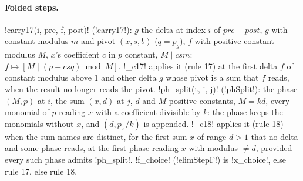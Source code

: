 {{{\paragraph{Folded steps.} \lexpy!carry17(i, pre, f, post)! (\lexlean!carry17!): $g$ the delta at index
$i$ of $pre + post$, $g$ with constant modulus $m$ and pivot $(x, s, b)$ ($q = p_g$), $f$ with
positive constant modulus $M$, $x$'s coefficient $c$ in $p$ constant, $M \mid csm$:
$f \mapsto [M \mid (p - c s q) \bmod M]$. \lexpy!_c17! applies it (rule 17) at the first delta $f$
of constant modulus above 1 and other delta $g$ whose pivot is a sum that $f$ reads, when the
result no longer reads the pivot. \lexpy!ph_split(t, i, j)! (\lexlean!phSplit!): the phase $(M, p)$ at
$i$, the sum $(x, d)$ at $j$, $d$ and $M$ positive constants, $M = kd$, every monomial of $p$
reading $x$ with a coefficient divisible by $k$: the phase keeps the monomials without $x$, and
$(d, p_x/k)$ is appended. \lexpy!_c18! applies it (rule 18) when the sum names are distinct, for
the first sum $x$ of range $d>1$ that no delta and some phase reads, at the first phase reading
$x$ with modulus $\ne d$, provided every such phase admits \lexpy!ph_split!. \lexpy!f_choice!
(\lexlean!elimStepF!) is \lexpy!x_choice!, else rule 17, else rule 18.

}}}
